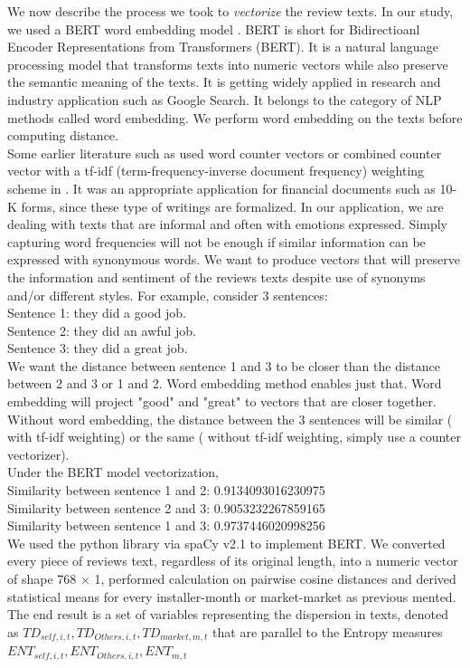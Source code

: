 \documentclass[msom,blindrev]{informs3}
\begin{document}
We now describe the process we took to \textit{vectorize} the review texts. In our study, we used a BERT word embedding model \citep{devlin2018bert}. BERT is short for Bidirectioanl Encoder Representations from Transformers (BERT). It is a natural language processing model that transforms texts into numeric vectors while also preserve the semantic meaning of the texts. It is getting widely applied in research and industry application such as Google Search. It belongs to the category of NLP methods called word embedding. We perform word embedding on the texts before computing distance. \\
Some earlier literature such as \cite{hoberg2016text} used word counter vectors or combined counter vector with a tf-idf (term-frequency-inverse document frequency) weighting scheme in \cite{loughran2011liability}. It was an appropriate application for financial documents such as 10-K forms, since these type of writings are formalized. In our application, we are dealing with texts that are informal and often with emotions expressed. Simply capturing word frequencies will not be enough if similar information can be expressed with synonymous words. We want to produce vectors that will preserve the information and sentiment of the reviews texts despite use of synonyms and/or different styles. For example, consider 3 sentences: \\
Sentence 1: they did a good job. \\
Sentence 2: they did an awful job. \\
Sentence 3: they did a great job. \\
We want the distance between sentence 1 and 3 to be closer than the distance between 2 and 3 or 1 and 2. Word embedding method enables just that. Word embedding will project "good" and "great" to vectors that are closer together. Without word embedding, the distance between the 3 sentences will be similar ( with tf-idf weighting) or the same ( without tf-idf weighting, simply use a counter vectorizer). \\
Under the BERT model vectorization, \\
Similarity between sentence 1 and 2: 0.9134093016230975\\
Similarity between sentence 2 and 3: 0.9053232267859165\\
Similarity between sentence 1 and 3: 0.9737446020998256\\

We used the python library via spaCy v2.1 to implement BERT. We converted every piece of reviews text, regardless of its original length, into a numeric vector of shape 768 $\times$ 1,  performed calculation on pairwise cosine distances and derived statistical means for every installer-month or market-market as previous mented. The end result is a set of variables representing the dispersion in texts, denoted as $TD_{self,i,t},TD_{Others,i,t},TD_{market,m,t}$ that are parallel to the Entropy measures $ENT_{self,i,t},ENT_{Others,i,t},ENT_{m,t}$ \\
\end{document}
